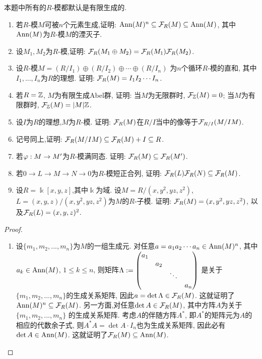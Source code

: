 \documentclass[oneside,a4papar,11pt,UTF8]{book}
\begin{document}
\begin{enumerate}[resume]
  \begin{prob}\label{ex-15-1-38}
    本题中所有的$R$-模都默认是有限生成的.
    \begin{enumerate}
      \item 若$R$-模$M$可被$n$个元素生成,证明:
      $\operatorname{Ann}(M)^n\subseteq\mathcal{F}_R(M)\subseteq\operatorname{Ann}(M)$,
      其中$\operatorname{Ann}(M)$为$R$-模$M$的湮灭子.
      \item 设$M_1,M_2$为$R$-模,证明:
      $\mathcal{F}_R(M_1\oplus M_2)=\mathcal{F}_R(M_1)\mathcal{F}_R(M_2)$.
      \item 设$R$-模$M=(R/I_1)\oplus(R/I_2)
      \oplus\cdots\oplus(R/I_n)$
      为$n$个循环$R$-模的直和,
      其中$I_1,...,I_n$为$R$的理想.
      证明: $\mathcal{F}_R(M)=I_1I_2\cdots I_n$.
      \item 若$R=\mathbb{Z}$, $M$为有限生成Abel群,
      证明: 当$M$为无限群时,
      $\mathcal{F}_{\mathbb{Z}}(M)=0$;
      当$M$为有限群时, $\mathcal{F}_{\mathbb{Z}}(M)=|M|\mathbb{Z}$.
      \item 设$I$为$R$的理想,$M$为$R$-模.
      证明: $\mathcal{F}_R(M)$在$R/I$当中的像等于$\mathcal{F}_{R/I}(M/IM)$.
      \item 记号同上,证明:
      $\mathcal{F}_R(M/IM)\subseteq\mathcal{F}_R(M)+I\subseteq R$.
      \item 若$\varphi:M\to M'$为$R$-模满同态.
      证明: $\mathcal{F}_R(M)\subseteq\mathcal{F}_R(M')$.
      \item 若$0\to L\to M\to N\to 0$为$R$-模短正合列,
      证明: $\mathcal{F}_R(L)\mathcal{F}_R(N)\subseteq\mathcal{F}_R(M)$.
      \item 设$R=\Bbbk[x,y,z]$,其中$\Bbbk$为域.
      设$M=R/(x,y^2,yz,z^2)$,
      $L=(x,y,z)/(x,y^2,yz,z^2)$为$M$的$R$-子模.
      证明: $\mathcal{F}_R(M)=(x,y^2,yz,z^2)$,
      以及$\mathcal{F}_R(L)=(x,y,z)^2$.
    \end{enumerate}
  \end{prob}

  \begin{proof}\,
    \begin{enumerate}
      \item 设$\{m_1,m_2,...,m_n\}$为$M$的一组生成元.
      对任意$a=a_1a_2\cdots a_n\in\operatorname{Ann}(M)^n$,
      其中$a_k\in\operatorname{Ann}(M)$, $1\leq k\leq n$,
      则矩阵$\Lambda:=\begin{pmatrix}
            a_1 &  &  &  \\
             & a_2 &  &  \\
             &  & \ddots &  \\
             &  &  & a_n
          \end{pmatrix}$
      是关于$\{m_1,m_2,...,m_n\}$的生成关系矩阵,
      因此$a=\det \Lambda\in\mathcal{F}_R(M)$.
      这就证明了$\operatorname{Ann}(M)^n\subseteq\mathcal{F}_R(M)$.
      另一方面,对任意$\det A\in\mathcal{F}_R(M)$,
      其中方阵$A$为关于$\{m_1,m_2,...,m_n\}$
      的生成关系矩阵.
      考虑$A$的伴随方阵$A^*$,
      即$A^*$的矩阵元为$A$的相应的代数余子式,
      则$A^*A=\det A\cdot I_{n}$也为生成关系矩阵,
      因此必有$\det A\in\operatorname{Ann}(M)$.
      这就证明了$\mathcal{F}_R(M)\subseteq\operatorname{Ann}(M)$.


\end{enumerate}
\end{proof}
\end{enumerate}
\end{document}
